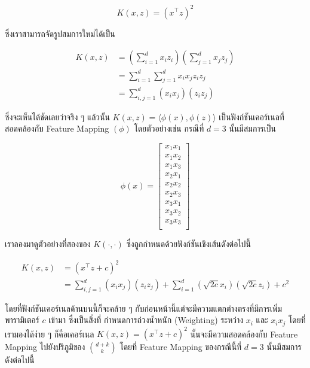 \begin{equation}
    K(x,z) = (x^{\top} z)^{2}
\end{equation}

\noindent ซึ่งเราสามารถจัดรูปสมการใหม่ได้เป็น

\begin{align}
    K(x,z) &= \left( \sum_{i=1}^d x_i z_i \right) \left( \sum_{j=1}^d x_j z_j \right)\\
    &= \sum_{i=1}^d \sum_{j=1}^d x_i x_j z_i z_j\\
    &= \sum_{i,j=1}^d (x_i x_j)(z_i z_j)
\end{align}

\noindent ซึ่งจะเห็นได้ชัดเลยว่าจริง ๆ แล้วนั้น $K(x,z) = \langle\phi(x),\phi(z)\rangle$ เป็นฟังก์ชันเคอร์เนลที่สอดคล้องกับ Feature 
Mapping $(\phi)$ โดยตัวอย่างเช่น กรณีที่ $d = 3$ นั้นมีสมการเป็น

\begin{equation}\label{eq:feature_map_ex1}
    \phi(x) = \begin{bmatrix}
    x_1 x_1\\
    x_1 x_2\\
    x_1 x_3\\
    x_2 x_1\\
    x_2 x_2\\
    x_2 x_3\\
    x_3 x_1\\
    x_3 x_2\\
    x_3 x_3\\
    \end{bmatrix}
\end{equation}

เราลองมาดูตัวอย่างที่สองของ $K(\cdot,\cdot)$ ซึ่งถูกกำหนดด้วยฟังก์ชันเชิงเส้นดังต่อไปนี้

\begin{align}
    K(x,z) &= (x^{\top} z + c)^2\\
    &= \sum_{i,j=1}^d (x_i x_j)(z_i z_j) + \sum_{i=1}^d \left(\sqrt{2c}x_i\right) \left(\sqrt{2c}z_i\right) 
    + c^2
\end{align}

\noindent โดยที่ฟังก์ชันเคอร์เนลด้านบนนี้ก็จะคล้าย ๆ กับก่อนหน้านี้แต่จะมีความแตกต่างตรงที่มีการเพิ่มพารามิเตอร์ $c$ เข้ามา ซึ่งเป็นสิ่งที่%
กำหนดการถ่วงน้ำหนัก (Weighting) ระหว่าง $x_{i}$ และ $x_{i}x_{j}$ โดยที่เรามองได้ง่าย ๆ ก็คือเคอร์เนล $K(x,z) = (x^{\top} 
z + c)^2$ นั้นจะมีความสอดคล้องกับ Feature Mapping ไปยังปริภูมิของ $\binom{d+k}{k}$ โดยที่ Feature Mapping ของกรณีนี้ที่ 
$d = 3$ นั้นมีสมการดังต่อไปนี้

